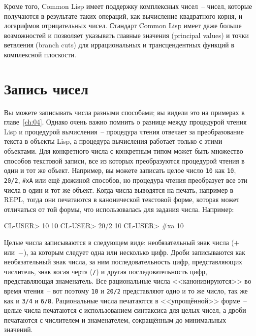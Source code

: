 Кроме того, Common Lisp имеет поддержку комплексных чисел~-- чисел, которые получаются в
результате таких операций, как вычисление квадратного корня, и логарифмов отрицательных
чисел. Стандарт Common Lisp имеет даже больше возможностей и позволяет указывать главные
значения (principal values) и точки ветвления (branch cuts) для иррациональных и
трансцендентных функций в комплексной плоскости.

\section{Запись чисел}

Вы можете записывать числа разными способами; вы видели это на примерах в
главе~\ref{ch:04}.  Однако очень важно помнить о разнице между процедурой чтения Lisp и
процедурой вычисления~-- процедура чтения отвечает за преобразование текста в объекты
Lisp, а процедура вычисления работает только с этими объектами.  Для конкретного числа с
конкретным типом может быть множество способов текстовой записи, все из которых
преобразуются процедурой чтения в один и тот же объект.  Например, вы можете записать
целое число \lstinline{10} как \lstinline{10}, \lstinline{20/2}, \lstinline{#xA} или ещё дюжиной способов,
но процедура чтения преобразует все эти числа в один и тот же объект.  Когда числа
выводятся на печать, например в REPL, тогда они печатаются в канонической текстовой форме,
которая может отличаться от той формы, что использовалась для задания числа.
Например:

\begin{myverb}
CL-USER> 10
10
CL-USER> 20/2
10
CL-USER> #xa
10
\end{myverb}

Целые числа записываются в следующем виде: необязательный знак числа ($+$ или~$-$), за
которым следует одна или несколько цифр.  Дроби записываются как необязательный знак
числа, за ним последовательность цифр, представляющих числитель, знак косая черта
(\lstinline{/}) и другая последовательность цифр, представляющая знаменатель.  Все
рациональные числа <<канонизируются>> во время чтения~-- вот поэтому \lstinline{10} и \lstinline{20/2}
представляют одно и то же число, так же как и \lstinline{3/4} и \lstinline{6/8}.  Рациональные числа
печатаются в <<упрощённой>> форме~-- целые числа печатаются с использованием синтаксиса для
целых чисел, а дроби печатаются с числителем и знаменателем, сокращённым до минимальных
значений.

